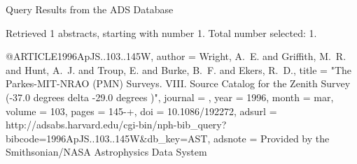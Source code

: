 Query Results from the ADS Database


Retrieved 1 abstracts, starting with number 1.  Total number selected: 1.

@ARTICLE{1996ApJS..103..145W,
   author = {{Wright}, A.~E. and {Griffith}, M.~R. and {Hunt}, A.~J. and 
	{Troup}, E. and {Burke}, B.~F. and {Ekers}, R.~D.},
    title = "{The Parkes-MIT-NRAO (PMN) Surveys. VIII. Source Catalog for the Zenith Survey (-37.0 degrees {\lt} delta {\lt} -29.0 degrees )}",
  journal = {\apjs},
     year = 1996,
    month = mar,
   volume = 103,
    pages = {145-+},
      doi = {10.1086/192272},
   adsurl = {http://adsabs.harvard.edu/cgi-bin/nph-bib_query?bibcode=1996ApJS..103..145W&db_key=AST},
  adsnote = {Provided by the Smithsonian/NASA Astrophysics Data System}
}


